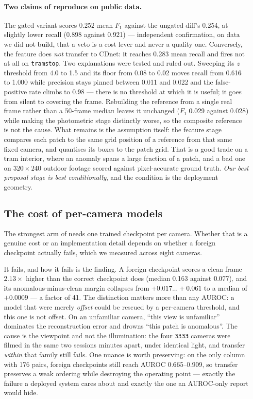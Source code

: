 \paragraph{Two claims of  reproduce on public data.}
The gated variant \armphotodino{} scores 0.252 mean $F_1$ against the ungated
diff's 0.254, at slightly lower recall (0.898 against 0.921) --- independent
confirmation, on data we did not build, that a veto is a cost lever and never a
quality one. Conversely, the feature \proposer{} does \emph{not} transfer to
CDnet: it reaches 0.283 mean recall and fires not at all on
\texttt{tramstop}. Two explanations were tested and ruled out. Sweeping its
$z$ threshold from 4.0 to 1.5 and its floor from 0.08 to 0.02 moves recall from
0.616 to 1.000 while precision stays pinned between 0.011 and 0.022 and the
false-positive rate climbs to 0.98 --- there is no threshold at which it is
useful; it goes from silent to covering the frame. Rebuilding the reference
from a single real frame rather than a 50-frame median leaves it unchanged
($F_1$ 0.029 against 0.028) while making the photometric stage distinctly
worse, so the composite reference is not the cause. What remains is the
assumption itself: the feature stage compares each patch to the same grid
position of a reference from that same fixed camera, and quantises its boxes to
the patch grid. That is a good trade on a tram interior, where an anomaly spans
a large fraction of a patch, and a bad one on $320\times240$ outdoor footage
scored against pixel-accurate ground truth. \emph{Our best proposal stage is
best conditionally}, and the condition is the deployment geometry.

\subsection{The cost of per-camera models}
\label{sec:results:transfer}

The strongest arm of  needs one trained checkpoint per camera.
Whether that is a genuine cost or an implementation detail depends on whether a
foreign checkpoint actually fails, which we measured across eight cameras.

It fails, and how it fails is the finding. A foreign checkpoint scores a clean
frame $2.13\times$ higher than the correct checkpoint does (median 0.163
against 0.077), and its anomalous-minus-clean margin collapses from
$+0.017 \ldots +0.061$ to a median of $+0.0009$ --- a factor of 41. The
distinction matters more than any AUROC: a model that were merely \emph{offset}
could be rescued by a per-camera threshold, and this one is not offset. On an
unfamiliar camera, ``this view is unfamiliar'' dominates the reconstruction
error and drowns ``this patch is anomalous''. The cause is the viewpoint and
not the illumination: the four \texttt{3333} cameras were filmed in the same
two sessions minutes apart, under identical light, and transfer \emph{within}
that family still fails. One nuance is worth preserving: on the only column
with 176 pairs, foreign checkpoints still reach AUROC 0.665--0.909, so transfer
preserves a weak ordering while destroying the operating point --- exactly the
failure a deployed system cares about and exactly the one an AUROC-only report
would hide.

